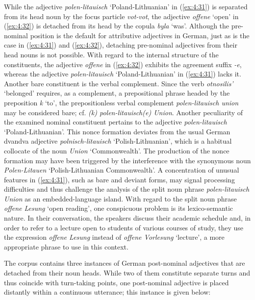 \noindent While the adjective \textit{polen-litauisch} `Poland-Lithuanian' in (\ref{ex:4:31}) is separated from its head noun by the focus particle \textit{vot-vot}, the adjective \textit{offene} `open' in (\ref{ex:4:32}) is detached from its head by the copula \textit{byla} `was'. Although the pre-nominal position is the default for attributive adjectives in German, just as is the case in (\ref{ex:4:31}) and (\ref{ex:4:32}), detaching pre-nominal adjectives from their head nouns is not possible. With regard to the internal structure of the constituents, the adjective \textit{offene} in (\ref{ex:4:32}) exhibits the agreement suffix \textit{-e}, whereas the adjective \textit{polen-litauisch} `Poland-Lithuanian' in (\ref{ex:4:31}) lacks it. Another bare constituent is the verbal complement. Since the verb \textit{otnosilis'} `belonged' requires, as a complement, a prepositional phrase headed by the preposition \textit{k} `to', the prepositionless verbal complement \textit{polen-litauisch union} may be considered bare; cf. \textit{(k) polen-litauisch(e) Union}. Another peculiarity of the examined nominal constituent pertains to the adjective \textit{polen-litauisch} `Poland-Lithuanian'. This nonce formation deviates from the usual German dvandva adjective \textit{polnisch-litauisch} `Polish-Lithuanian', which is a habitual collocate of the noun \textit{Union} `Commonwealth'. The production of the nonce formation may have been triggered by the interference with the synonymous noun \textit{Polen-Litauen} `Polish-Lithuanian Commonwealth'. A concentration of unusual features in (\ref{ex:4:31}), such as bare and deviant forms, may signal processing difficulties and thus challenge the analysis of the split noun phrase \textit{polen-litauisch Union} as an embedded-language island. With regard to the split noun phrase \textit{offene Lesung} `open reading', one conspicuous problem is its lexico-semantic nature. In their conversation, the speakers discuss their academic schedule and, in order to refer to a lecture open to students of various courses of study, they use the expression \textit{offene Lesung} instead of \textit{offene Vorlesung} `lecture',  a more appropriate phrase to use in this context.

The corpus contains three instances of German post-nominal adjectives that are detached from their noun heads. While two of them constitute separate turns and thus coincide with turn-taking points, one post-nominal adjective is placed distantly within a continuous utterance; this instance is given below:

